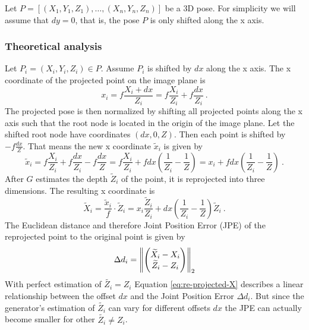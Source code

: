 Let $P = [(X_1, Y_1, Z_1), \dotsc, (X_n, Y_n, Z_n)]$ be a 3D pose.
For simplicity we will assume that $dy = 0$, that is, the pose $P$ is only shifted along the x axis.

\subsubsection{Theoretical analysis}
Let $P_i = (X_i, Y_i, Z_i) \in P$. 
Assume $P_i$ is shifted by $dx$ along the x axis.
The x coordinate of the projected point on the image plane is
\begin{equation}
	x_i = f \frac{X_i + dx}{Z_i} = f \frac{X_i}{Z_i} + f \frac{dx}{Z_i}\ .
\end{equation}
The projected pose is then normalized by shifting all projected points along the x axis such that the root node is located in the origin of the image plane.
Let the shifted root node have coordinates $(dx, 0, Z)$.
Then each point is shifted by $- f \frac{dx}{Z}$.
That means the new x coordinate $\widetilde{x}_i$ is given by
\begin{equation}
	\widetilde{x}_i = f \frac{X_i}{Z_i} + f \frac{dx}{Z_i} - f \frac{dx}{Z} 
	= f \frac{X_i}{Z_i} + f dx (\frac{1}{Z_i} - \frac{1}{Z})
	= x_i + f dx (\frac{1}{Z_i} - \frac{1}{Z})\ .
\end{equation}
After $G$ estimates the depth $\widetilde{Z}_i$ of the point, it is reprojected into three dimensions. The resulting x coordinate is 
\begin{equation}
	\label{eq:re-projected-X}
	\widetilde{X}_i = \frac{\widetilde{x}_i}{f} \cdot \widetilde{Z}_i
	= x_i \frac{\widetilde{Z}_i}{Z_i} + dx (\frac{1}{Z_i} - \frac{1}{Z}) \widetilde{Z}_i \ .
\end{equation}
The Euclidean distance and therefore Joint Position Error (JPE) of the reprojected point to the original point is given by
\begin{equation}
\label{eq:delta-d}
	\Delta d_i = \norm{ 
	\begin{pmatrix}
		\widetilde{X}_i - X_i \\
		\widetilde{Z}_i - Z_i
	\end{pmatrix}
	}_2
\end{equation}
With perfect estimation of $\widetilde{Z_i} = Z_i$ Equation \eqref{eq:re-projected-X} describes a linear relationship between the offset $dx$ and the Joint Position Error $\Delta d_i$.
But since the generator's estimation of $\widetilde{Z_i}$ can vary for different offsets $dx$ the JPE can actually become smaller for other $\widetilde{Z_i} \neq Z_i$. 
